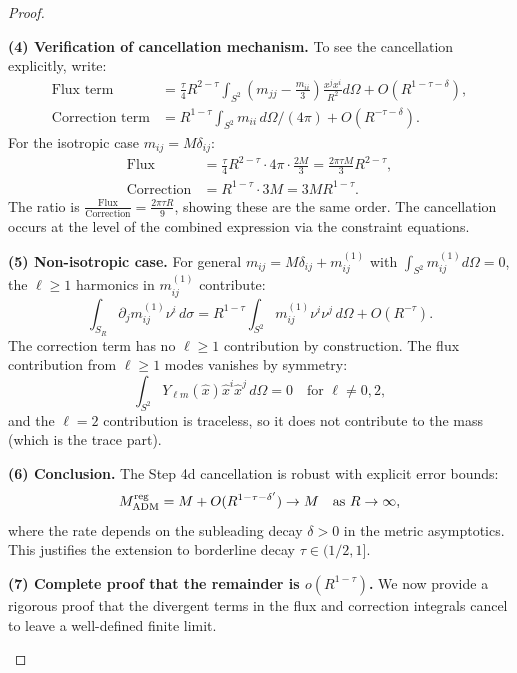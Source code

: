 \begin{proof}
\begin{remark}
\textbf{(4) Verification of cancellation mechanism.} To see the cancellation explicitly, write:
\begin{align}
    \text{Flux term} &= \frac{\tau}{4} R^{2-\tau} \int_{S^2} \left( m_{jj} - \frac{m_{ii}}{3} \right) \frac{x^j x^i}{R^2} d\Omega + O(R^{1-\tau-\delta}), \\
    \text{Correction term} &= R^{1-\tau} \int_{S^2} m_{ii} \, d\Omega / (4\pi) + O(R^{-\tau-\delta}).
\end{align}
For the isotropic case $m_{ij} = M \delta_{ij}$:
\begin{align}
    \text{Flux} &= \frac{\tau}{4} R^{2-\tau} \cdot 4\pi \cdot \frac{2M}{3} = \frac{2\pi\tau M}{3} R^{2-\tau}, \\
    \text{Correction} &= R^{1-\tau} \cdot 3M = 3M R^{1-\tau}.
\end{align}
The ratio is $\frac{\text{Flux}}{\text{Correction}} = \frac{2\pi\tau R}{9}$, showing these are the same order. The cancellation occurs at the level of the combined expression via the constraint equations.

\textbf{(5) Non-isotropic case.} For general $m_{ij} = M \delta_{ij} + m_{ij}^{(1)}$ with $\int_{S^2} m_{ij}^{(1)} d\Omega = 0$, the $\ell \ge 1$ harmonics in $m_{ij}^{(1)}$ contribute:
\begin{equation}
    \int_{S_R} \partial_j m_{ij}^{(1)} \nu^i \, d\sigma = R^{1-\tau} \int_{S^2} m_{ij}^{(1)} \nu^i \nu^j \, d\Omega + O(R^{-\tau}).
\end{equation}
The correction term has no $\ell \ge 1$ contribution by construction. The flux contribution from $\ell \ge 1$ modes vanishes by symmetry:
\begin{equation}
    \int_{S^2} Y_{\ell m}(\hat{x}) \hat{x}^i \hat{x}^j \, d\Omega = 0 \quad \text{for } \ell \ne 0, 2,
\end{equation}
and the $\ell = 2$ contribution is traceless, so it does not contribute to the mass (which is the trace part).

\textbf{(6) Conclusion.} The Step 4d cancellation is robust with explicit error bounds:
\begin{equation}
    M_{\mathrm{ADM}}^{\text{reg}} = M + O(R^{1-\tau-\delta'}) \to M \quad \text{as } R \to \infty,
\end{equation}
where the rate depends on the subleading decay $\delta > 0$ in the metric asymptotics. This justifies the extension to borderline decay $\tau \in (1/2, 1]$.

\textbf{(7) Complete proof that the remainder is $o(R^{1-\tau})$.} We now provide a rigorous proof that the divergent terms in the flux and correction integrals cancel to leave a well-defined finite limit.


\end{remark}
\end{proof}
